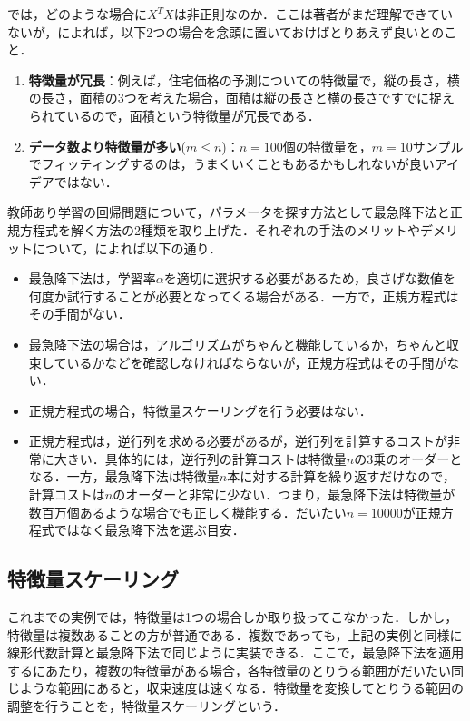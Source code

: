 では，どのような場合に$X^TX$は非正則なのか．ここは著者がまだ理解できていないが，\cite{AndrewML}によれば，以下2つの場合を念頭に置いておけばとりあえず良いとのこと．
\begin{enumerate}
\item {\bf 特徴量が冗長}：例えば，住宅価格の予測についての特徴量で，縦の長さ，横の長さ，面積の3つを考えた場合，面積は縦の長さと横の長さですでに捉えられているので，面積という特徴量が冗長である．
\item {\bf データ数より特徴量が多い}($m \leq n$)：$n=100$個の特徴量を，$m=10$サンプルでフィッティングするのは，うまくいくこともあるかもしれないが良いアイデアではない．
\end{enumerate}

教師あり学習の回帰問題について，パラメータを探す方法として最急降下法と正規方程式を解く方法の2種類を取り上げた．それぞれの手法のメリットやデメリットについて，\cite{AndrewML}によれば以下の通り．
\begin{itemize}
\item 最急降下法は，学習率$\alpha $を適切に選択する必要があるため，良さげな数値を何度か試行することが必要となってくる場合がある．一方で，正規方程式はその手間がない．
\item 最急降下法の場合は，アルゴリズムがちゃんと機能しているか，ちゃんと収束しているかなどを確認しなければならないが，正規方程式はその手間がない．
\item 正規方程式の場合，特徴量スケーリングを行う必要はない．
\item 正規方程式は，逆行列を求める必要があるが，逆行列を計算するコストが非常に大きい．具体的には，逆行列の計算コストは特徴量$n$の3乗のオーダーとなる．一方，最急降下法は特徴量$n$本に対する計算を繰り返すだけなので，計算コストは$n$のオーダーと非常に少ない．つまり，最急降下法は特徴量が数百万個あるような場合でも正しく機能する．だいたい$n=10000$が正規方程式ではなく最急降下法を選ぶ目安．
\end{itemize}

\subsection{特徴量スケーリング}

これまでの実例では，特徴量は1つの場合しか取り扱ってこなかった．しかし，特徴量は複数あることの方が普通である．複数であっても，上記の実例と同様に線形代数計算と最急降下法で同じように実装できる．ここで，最急降下法を適用するにあたり，複数の特徴量がある場合，各特徴量のとりうる範囲がだいたい同じような範囲にあると，収束速度は速くなる．特徴量を変換してとりうる範囲の調整を行うことを，特徴量スケーリングという．


